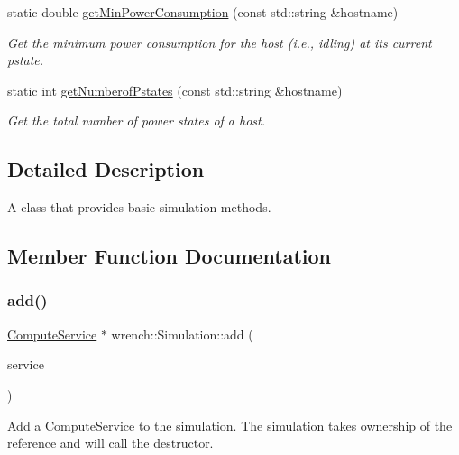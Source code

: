 \begin{DoxyCompactItemize}
static double \hyperlink{classwrench_1_1_simulation_afdf2ae84f6b3c8b51c5189199bebb52e}{get\+Min\+Power\+Consumption} (const std\+::string \&hostname)
\begin{DoxyCompactList}\small\item\em Get the minimum power consumption for the host (i.\+e., idling) at its current pstate. \end{DoxyCompactList}\item 
static int \hyperlink{classwrench_1_1_simulation_a5e8d5b963d2278c79b49a0ed7db2b933}{get\+Numberof\+Pstates} (const std\+::string \&hostname)
\begin{DoxyCompactList}\small\item\em Get the total number of power states of a host. \end{DoxyCompactList}\end{DoxyCompactItemize}


\subsection{Detailed Description}
A class that provides basic simulation methods. 

\subsection{Member Function Documentation}
\mbox{\label{classwrench_1_1_simulation_ad1f5c12285ecfaf5a2ce7dab5ec8b4c5}} 
\subsubsection{\texorpdfstring{add()}{add()}\hspace{0.1cm}{\footnotesize\ttfamily [1/5]}}
{\footnotesize\ttfamily \hyperlink{classwrench_1_1_compute_service}{Compute\+Service} $\ast$ wrench\+::\+Simulation\+::add (\begin{DoxyParamCaption}\item[{\hyperlink{classwrench_1_1_compute_service}{Compute\+Service} $\ast$}]{service }\end{DoxyParamCaption})}



Add a \hyperlink{classwrench_1_1_compute_service}{Compute\+Service} to the simulation. The simulation takes ownership of the reference and will call the destructor. 


